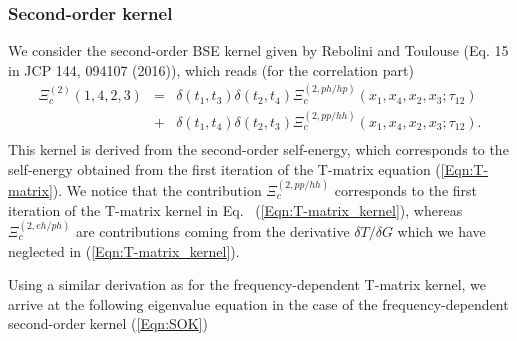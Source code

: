 \documentclass[a4paper,superscriptaddress,twocolumn,aps,prb,floatfix,citeautoscript]{revtex4-1}\usepackage[utf8]{inputenc}
\begin{document}
\subsubsection{Second-order kernel}
We consider the second-order BSE kernel given by Rebolini and Toulouse (Eq. 15 in JCP 144, 094107 (2016)), which reads (for the correlation part) 
\begin{eqnarray}
\Xi^{(2)}_c(1,4,2,3)&=&\delta(t_1,t_3)\delta(t_2,t_4)\Xi^{(2,ph/hp)}_c(x_1,x_4,x_2,x_3;\tau_{12})\nonumber\\
&+&\delta(t_1,t_4)\delta(t_2,t_3)\Xi^{(2,pp/hh)}_c(x_1,x_4,x_2,x_3;\tau_{12}).\nonumber\\
\label{Eqn:SOK}
\end{eqnarray}
This kernel is derived from the second-order self-energy, which corresponds to the self-energy obtained from the first iteration of the T-matrix equation (\ref{Eqn:T-matrix}). We notice that the contribution $\Xi^{(2,pp/hh)}_c$ corresponds to the first iteration of the T-matrix kernel in Eq.~ (\ref{Eqn:T-matrix_kernel}), whereas $\Xi^{(2,eh/ph)}_c$ are contributions coming from the derivative $\delta T/\delta G$ which we have neglected in  (\ref{Eqn:T-matrix_kernel}). 

Using a similar derivation as for the frequency-dependent T-matrix kernel, we arrive at the following eigenvalue equation in the case of the frequency-dependent second-order kernel (\ref{Eqn:SOK})
\end{document}
